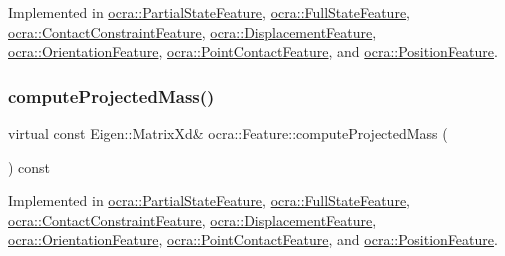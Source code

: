 Implemented in \hyperlink{classocra_1_1PartialStateFeature_a9554341f9015361e4c7dc544f6415470}{ocra\+::\+Partial\+State\+Feature}, \hyperlink{classocra_1_1FullStateFeature_a40f68dad4e231a19b6566fa6829b8f90}{ocra\+::\+Full\+State\+Feature}, \hyperlink{classocra_1_1ContactConstraintFeature_ac4dec3a5defe2c50e6084d49a1838883}{ocra\+::\+Contact\+Constraint\+Feature}, \hyperlink{classocra_1_1DisplacementFeature_a3c72ecae0cb33a812c66b0770baf09bf}{ocra\+::\+Displacement\+Feature}, \hyperlink{classocra_1_1OrientationFeature_ae30a255a7e0edf9704c0c8e2dbd5447f}{ocra\+::\+Orientation\+Feature}, \hyperlink{classocra_1_1PointContactFeature_a3798f3cd3649bf2360876610f7a4cf7a}{ocra\+::\+Point\+Contact\+Feature}, and \hyperlink{classocra_1_1PositionFeature_a093701bd80310d92ea3d3f81c9ea629a}{ocra\+::\+Position\+Feature}.

\hypertarget{classocra_1_1Feature_a99ac023809c0cf34b5d582537934b08c}{}\label{classocra_1_1Feature_a99ac023809c0cf34b5d582537934b08c} 
\subsubsection{\texorpdfstring{compute\+Projected\+Mass()}{computeProjectedMass()}\hspace{0.1cm}{\footnotesize\ttfamily [2/2]}}
{\footnotesize\ttfamily virtual const Eigen\+::\+Matrix\+Xd\& ocra\+::\+Feature\+::compute\+Projected\+Mass (\begin{DoxyParamCaption}{ }\end{DoxyParamCaption}) const\hspace{0.3cm}{\ttfamily [pure virtual]}}



Implemented in \hyperlink{classocra_1_1PartialStateFeature_a984c0fd5400ff69faaab55d81cf8320b}{ocra\+::\+Partial\+State\+Feature}, \hyperlink{classocra_1_1FullStateFeature_a5f2a243a7df81e7843bc258bef9cfae8}{ocra\+::\+Full\+State\+Feature}, \hyperlink{classocra_1_1ContactConstraintFeature_ab926340d6c6d00b1358ae99432e15398}{ocra\+::\+Contact\+Constraint\+Feature}, \hyperlink{classocra_1_1DisplacementFeature_a31902186d804823eea5ba0177ed85ced}{ocra\+::\+Displacement\+Feature}, \hyperlink{classocra_1_1OrientationFeature_a6db043f4cce0767fe530c2e14aa9f48a}{ocra\+::\+Orientation\+Feature}, \hyperlink{classocra_1_1PointContactFeature_a04933fcbcc63eee1d7dbf926a0cbca8a}{ocra\+::\+Point\+Contact\+Feature}, and \hyperlink{classocra_1_1PositionFeature_aed6469ba39dae7d5ed76ee6f78ee8b5e}{ocra\+::\+Position\+Feature}.


